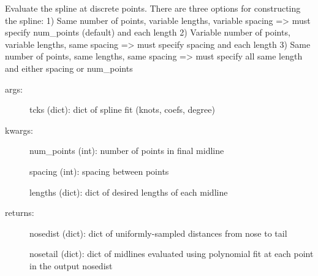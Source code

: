 \documentclass[letterpaper,10pt,openany,oneside]{sphinxmanual}
\begin{document}
\begin{fulllineitems}
\label{index:splinefit.evalbspline}
Evaluate the spline at discrete points.    
There are three options for constructing the spline: 
1) Same number of points, variable lengths, variable spacing 
=\textgreater{} must specify num\_points (default) and each length 
2) Variable number of points, variable lengths, same spacing 
=\textgreater{} must specify spacing and each length 
3) Same number of points, same lengths, same spacing 
=\textgreater{} must specify all same length and either spacing or num\_points
\begin{description}
\item[{args:}] \leavevmode
tcks (dict): dict of spline fit (knots, coefs, degree)

\item[{kwargs:}] \leavevmode
num\_points (int): number of points in final midline

spacing (int): spacing between points

lengths (dict): dict of desired lengths of each midline

\item[{returns:}] \leavevmode
nosedist (dict): dict of uniformly-sampled distances from nose to tail

nosetail (dict): dict of midlines evaluated using polynomial fit at 
each point in the output nosedist

\end{description}

\end{fulllineitems}

\end{document}
